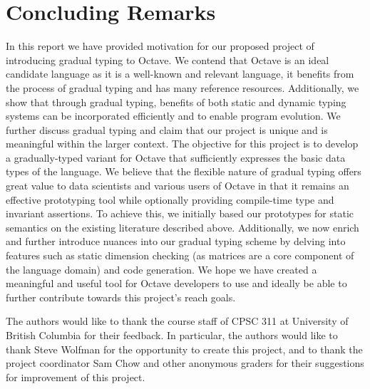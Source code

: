 \section{Concluding Remarks}
In this report we have provided motivation for our proposed project of introducing gradual typing to Octave. We contend that Octave is an ideal candidate language as it is a well-known and relevant language, it benefits from the process of gradual typing and has many reference resources. Additionally, we show that through gradual typing, benefits of both static and dynamic typing systems can be incorporated efficiently and to enable program evolution. We further discuss gradual typing and claim that our project is unique and is meaningful within the larger context. The objective for this project is to develop a gradually-typed variant for Octave that sufficiently expresses the basic data types of the language. We believe that the flexible nature of gradual typing offers great value to data scientists and various users of Octave in that it remains an effective prototyping tool while optionally providing compile-time type and invariant assertions. To achieve this, we initially based our prototypes for static semantics on the existing literature described above. Additionally, we now enrich and further introduce nuances into our gradual typing scheme by delving into features such as static dimension checking (as matrices are a core component of the language domain) and code generation. We hope we have created a meaningful and useful tool for Octave developers to use and ideally be able to further contribute towards this project's reach goals.

\appendix

\begin{acks}
    The authors would like to thank the course staff of CPSC 311 at University of British Columbia for their feedback. In particular, the authors would like to thank Steve Wolfman for the opportunity to create this project, and to thank the project coordinator Sam Chow and other anonymous graders for their suggestions for improvement of this project.
\end{acks}

